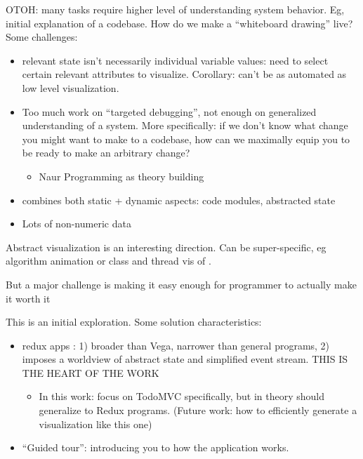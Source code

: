 \documentclass{sigchi}
\providecommand{\tightlist}{%
  \setlength{\itemsep}{0pt}\setlength{\parskip}{0pt}}
\begin{document}
OTOH: many tasks require higher level of understanding system behavior.
Eg, initial explanation of a codebase. How do we make a ``whiteboard
drawing'' live? Some challenges:

\begin{itemize}
\tightlist
\item
  relevant state isn't necessarily individual variable values: need to
  select certain relevant attributes to visualize. Corollary: can't be
  as automated as low level visualization.
\item
  Too much work on ``targeted debugging'', not enough on generalized
  understanding of a system. More specifically: if we don't know what
  change you might want to make to a codebase, how can we maximally
  equip you to be ready to make an arbitrary change?

  \begin{itemize}
  \tightlist
  \item
    Naur Programming as theory building
  \end{itemize}
\item
  combines both static + dynamic aspects: code modules, abstracted state
\item
  Lots of non-numeric data
\end{itemize}

Abstract visualization is an interesting direction. Can be
super-specific, eg algorithm animation \autocite{brown1984,stasko1990}
or class and thread vis of \autocite{reiss2003,reiss2005}.

But a major challenge is making it easy enough for programmer to
actually make it worth it \autocite{reiss2007}

This is an initial exploration. Some solution characteristics:

\begin{itemize}
\tightlist
\item
  redux apps \autocite{czaplicki,fowler2020}: 1) broader than Vega,
  narrower than general programs, 2) imposes a worldview of abstract
  state and simplified event stream. THIS IS THE HEART OF THE WORK

  \begin{itemize}
  \tightlist
  \item
    In this work: focus on TodoMVC specifically, but in theory should
    generalize to Redux programs. (Future work: how to efficiently
    generate a visualization like this one)
  \end{itemize}
\item
  ``Guided tour'': introducing you to how the application works.
\end{itemize}
\end{document}
